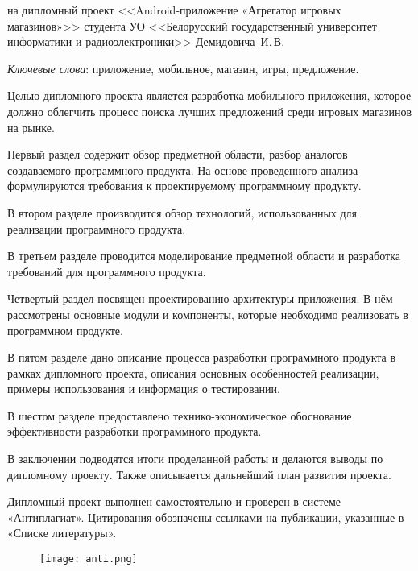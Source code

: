 \thispagestyle{empty}

\begin{center}
  \begin{minipage}{0.82\textwidth}
    на дипломный проект <<Android-приложение «Агрегатор игровых магазинов»>> студента УО <<Белорусский государственный университет информатики и радиоэлектроники>> Демидовича~И.\,В.
  \end{minipage}
\end{center}

\emph{Ключевые слова}: приложение, мобильное, магазин, игры, предложение.
\vspace{1\parsep}

Целью дипломного проекта является разработка мобильного приложения, которое должно облегчить процесс поиска лучших предложений среди игровых магазинов на рынке.

Первый раздел содержит обзор предметной области, разбор аналогов создаваемого программного продукта. На основе проведенного анализа формулируются требования к проектируемому программному продукту.

В втором разделе производится обзор технологий, использованных для реализации программного продукта.

В третьем разделе проводится моделирование предметной области и разработка требований для программного продукта.

Четвертый раздел посвящен проектированию архитектуры приложения. В нём рассмотрены основные модули и компоненты, которые необходимо реализовать в программном продукте.

В пятом разделе дано описание процесса разработки программного продукта в рамках дипломного проекта, описания основных особенностей реализации, примеры использования и информация о тестировании.

В шестом разделе предоставлено технико-экономическое обоснование эффективности разработки программного продукта.

В заключении подводятся итоги проделанной работы и делаются выводы по дипломному проекту. Также описывается дальнейший план развития проекта.

Дипломный проект выполнен самостоятельно и проверен в системе «Антиплагиат». Цитирования обозначены ссылками на публикации, указанные в «Списке литературы».
\begin{figure}[H]
  \centering
    \texttt{[image: anti.png]} 
    \label{fig:anti}
 \end{figure}
\clearpage